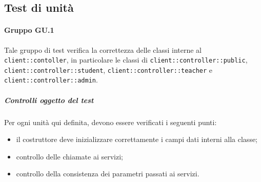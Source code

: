 \documentclass[12pt,a4paper]{article}
\begin{document}
	\subsection{Test di unità}\label{test_unita}
	\paragraph{Gruppo GU.1}
	Tale gruppo di test verifica la correttezza delle classi interne al  \texttt{client::contoller}, in particolare le classi di \texttt{client::controller::public}, \texttt{client::controller::student}, \texttt{client::controller::teacher} e \texttt{client::controller::admin}.
	
	\subparagraph{Controlli oggetto del test}
	Per ogni unità  qui definita, devono essere verificati i seguenti punti:
	
	\begin{itemize}
		\item il costruttore deve inizializzare correttamente i campi dati interni alla classe;
		\item controllo delle chiamate ai servizi;
		\item controllo della consistenza dei parametri passati ai servizi.
	\end{itemize}
	
\end{document}
